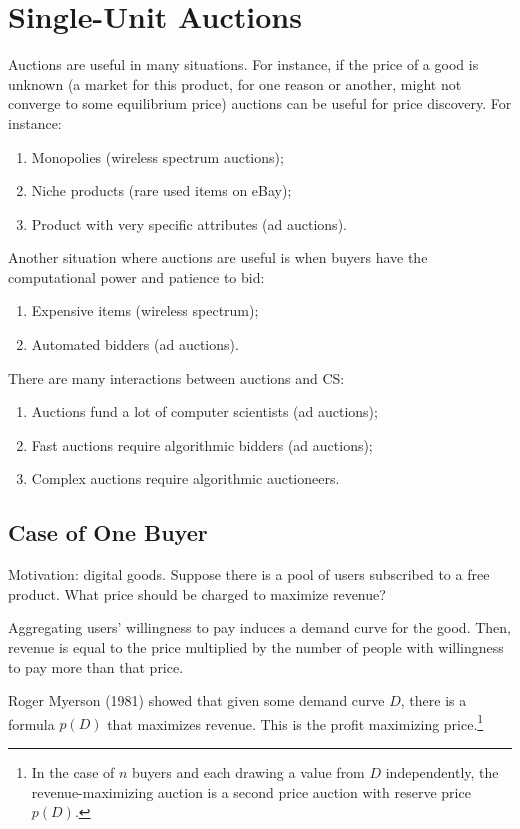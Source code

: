 \documentclass[dvipsnames]{article}
\theoremstyle{definition}
\theoremstyle{remark}
\begin{document}
\newpage

\section{Single-Unit Auctions}
Auctions are useful in many situations. For instance, if the price of a good is unknown (a market for this product, for one reason or another, might not converge to some equilibrium price) auctions can be useful for price discovery. For instance:
\begin{enumerate}
	\item Monopolies (wireless spectrum auctions);
	\item Niche products (rare used items on eBay);
	\item Product with very specific attributes (ad auctions).
\end{enumerate}
Another situation where auctions are useful is when buyers have the computational power and patience to bid:
\begin{enumerate}
	\item Expensive items (wireless spectrum);
	\item Automated bidders (ad auctions).
\end{enumerate}
There are many interactions between auctions and CS:
\begin{enumerate}
	\item Auctions fund a lot of computer scientists (ad auctions);
	\item Fast auctions require algorithmic bidders (ad auctions);
	\item Complex auctions require algorithmic auctioneers. 
\end{enumerate}

\subsection{Case of One Buyer}
Motivation: digital goods. Suppose there is a pool of users subscribed to a free product. What price should be charged to maximize revenue?

Aggregating users' willingness to pay induces a demand curve for the good. Then, revenue is equal to the price multiplied by the number of people with willingness to pay more than that price.

Roger Myerson (1981) showed that given some demand curve $D$, there is a formula $p(D)$ that maximizes revenue. This is the profit maximizing price.\footnote{In the case of $n$ buyers and each drawing a value from $D$ independently, the revenue-maximizing auction is a second price auction with reserve price $p(D)$.} 
\end{document}
